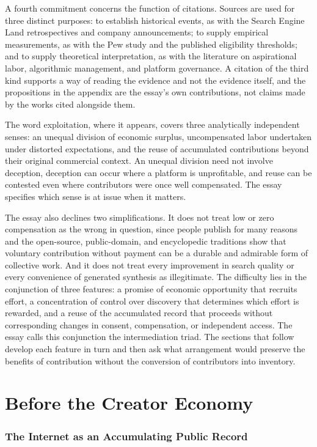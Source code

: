 \documentclass[11pt]{article}
\theoremstyle{remark}
\begin{document}
A fourth commitment concerns the function of citations. Sources are used for three distinct purposes: to establish historical events, as with the Search Engine Land retrospectives and company announcements; to supply empirical measurements, as with the Pew study and the published eligibility thresholds; and to supply theoretical interpretation, as with the literature on aspirational labor, algorithmic management, and platform governance. A citation of the third kind supports a way of reading the evidence and not the evidence itself, and the propositions in the appendix are the essay's own contributions, not claims made by the works cited alongside them.

The word exploitation, where it appears, covers three analytically independent senses: an unequal division of economic surplus, uncompensated labor undertaken under distorted expectations, and the reuse of accumulated contributions beyond their original commercial context. An unequal division need not involve deception, deception can occur where a platform is unprofitable, and reuse can be contested even where contributors were once well compensated. The essay specifies which sense is at issue when it matters.

The essay also declines two simplifications. It does not treat low or zero compensation as the wrong in question, since people publish for many reasons and the open-source, public-domain, and encyclopedic traditions show that voluntary contribution without payment can be a durable and admirable form of collective work. And it does not treat every improvement in search quality or every convenience of generated synthesis as illegitimate. The difficulty lies in the conjunction of three features: a promise of economic opportunity that recruits effort, a concentration of control over discovery that determines which effort is rewarded, and a reuse of the accumulated record that proceeds without corresponding changes in consent, compensation, or independent access. The essay calls this conjunction the intermediation triad. The sections that follow develop each feature in turn and then ask what arrangement would preserve the benefits of contribution without the conversion of contributors into inventory.

\part{Before the Creator Economy}

\section{The Internet as an Accumulating Public Record}
\end{document}
